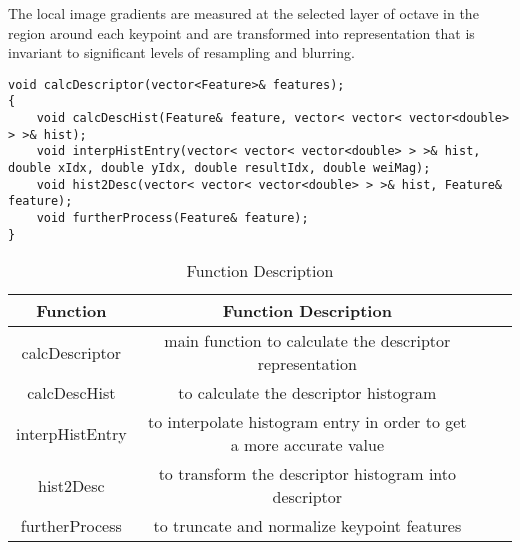 \documentclass[paper=a4, fontsize=11pt]{scrartcl} %
\numberwithin{equation}{section} %
\numberwithin{figure}{section} %
\numberwithin{table}{section} %
\begin{document}
The local image gradients are measured at the selected layer of octave in the region around each keypoint and are transformed into representation that is invariant to significant levels of resampling and blurring.

\clearpage

\begin{lstlisting}
void calcDescriptor(vector<Feature>& features);
{
    void calcDescHist(Feature& feature, vector< vector< vector<double> > >& hist);
    void interpHistEntry(vector< vector< vector<double> > >& hist, double xIdx, double yIdx, double resultIdx, double weiMag);
    void hist2Desc(vector< vector< vector<double> > >& hist, Feature& feature);
    void furtherProcess(Feature& feature);
}
\end{lstlisting}

\begin{table}[h]
    \centering
    \begin{tabular}{|c|c| lp{}}
        \hline
        \textbf{Function} & \textbf{Function Description} \\\hline
calcDescriptor & main function to calculate the descriptor representation\\\hline
calcDescHist& to calculate the descriptor histogram\\\hline
interpHistEntry& to interpolate histogram entry in order to get a more accurate value\\\hline
hist2Desc& to transform the descriptor histogram into descriptor\\\hline
furtherProcess & to truncate and normalize keypoint features\\\hline
    \end{tabular}
    \caption{Function Description}\label{nolock}
\end{table}
\end{document}
